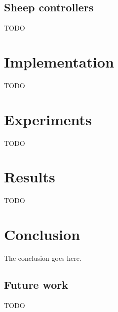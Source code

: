 \documentclass[conference]{IEEEtran}
\begin{document}
\subsection{Sheep controllers}
TODO

\section{Implementation}
TODO

\section{Experiments}
TODO

\section{Results}
TODO

\section{Conclusion}
The conclusion goes here.

\subsection{Future work}
TODO





\end{document}
